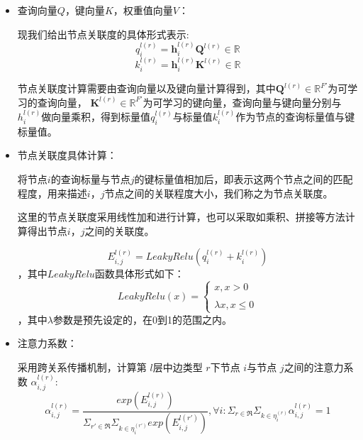 \documentclass{ctexart}
\begin{document}
\begin{itemize}
    \item 查询向量$Q$，键向量$K$，权重值向量$V$：
    
    现我们给出节点关联度的具体形式表示:
    \begin{equation}
        q_i^{l(r)}=\mathbf{h}^{l(r)}_i\mathbf{Q}^{l(r)}\in\mathbb{R}
        \label{q}
    \end{equation}
    \begin{equation}
        k_i^{l(r)}=\mathbf{h}^{l(r)}_i\mathbf{K}^{l(r)}\in\mathbb{R}
        \label{k}
    \end{equation}

    

节点关联度计算需要由查询向量以及键向量计算得到，其中$\mathbf{Q}^{l(r)}\in\mathbb{R}^{F'}$为可学习的查询向量， $\mathbf{K}^{l(r)}\in\mathbb{R}^{F'}$为可学习的键向量，查询向量与键向量分别与$h_i^{l(r)}$做向量乘积，得到标量值$q_i^{l(r)}$与标量值$k_i^{l(r)}$作为节点的查询标量值与键标量值。

    \item 节点关联度具体计算：
    
    将节点$i$的查询标量与节点$j$的键标量值相加后，即表示这两个节点之间的匹配程度，用来描述$i$，$j$节点之间的关联程度大小，我们称之为节点关联度。

这里的节点关联度采用线性加和进行计算，也可以采取如乘积、拼接等方法计算得出节点$i$，$j$之间的关联度。

\begin{equation}
    E_{i,j}^{l(r)} = LeakyRelu(q_i^{l(r)}+k_i^{l(r)})
\end{equation}
，其中$LeakyRelu$函数具体形式如下：
\begin{equation}
    LeakyRelu(x)=\begin{cases}x,x>0 \\\\ \lambda x,x\leq 0\end{cases}
\end{equation}
，其中$\lambda$参数是预先设定的，在0到1的范围之内。
    \item 注意力系数： 
    
    采用跨关系传播机制，计算第 $l$层中边类型 $r$下节点 $i$与节点  $j$之间的注意力系数 $\alpha_{i,j}^{l(r)}$:
    \begin{equation}
        \alpha_{i,j}^{l(r)}=\frac{exp(E_{i,j}^{l(r)})}{\Sigma_{r'\in\mathfrak{R}}\Sigma_{k\in{\eta_{i}^{(r')}}}exp(E_{i,j}^{l(r')})},\forall i:\Sigma_{r\in\mathfrak{R}}\Sigma_{k\in{\eta_{i}^{(r)}}}\alpha_{i,j}^{l(r)}=1
        \label{al}
    \end{equation}


\end{itemize}
\end{document}
